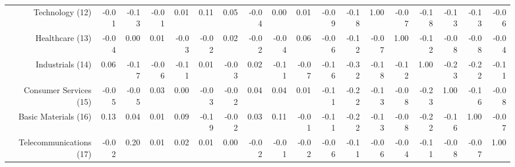 \begin{sidewaystable}
{\begin{tabular}{rrrrrrrrrrrrrrrrrr}
Technology (12)         & -0.01 & -0.13 & -0.01 & 0.01  & 0.11  & 0.05  & -0.04 & 0.00  & 0.01  & -0.09 & -0.18 & 1.00  & -0.07 & -0.18 & -0.13 & -0.13 & -0.06 \\
Healthcare (13)         & -0.04 & 0.00  & 0.01  & -0.03 & -0.02 & 0.02  & -0.02 & -0.04 & 0.06  & -0.06 & -0.12 & -0.07 & 1.00  & -0.12 & -0.08 & -0.08 & -0.04 \\
Industrials (14)        & 0.06  & -0.17 & -0.06 & -0.11 & 0.01  & -0.03 & 0.02  & -0.11 & -0.07 & -0.16 & -0.32 & -0.18 & -0.12 & 1.00  & -0.23 & -0.22 & -0.11 \\
Consumer Services (15)  & -0.05 & -0.05 & 0.03  & 0.00  & -0.03 & -0.02 & 0.04  & 0.04  & 0.01  & -0.11 & -0.22 & -0.13 & -0.08 & -0.23 & 1.00  & -0.16 & -0.08 \\
Basic Materials (16)    & 0.13  & 0.04  & 0.01  & 0.09  & -0.19 & -0.02 & 0.03  & 0.11  & -0.01 & -0.11 & -0.22 & -0.13 & -0.08 & -0.22 & -0.16 & 1.00  & -0.07 \\
Telecommunications (17) & -0.02 & 0.20  & 0.01  & 0.02  & 0.01  & 0.00  & -0.02 & -0.01 & -0.02 & -0.06 & -0.11 & -0.06 & -0.04 & -0.11 & -0.08 & -0.07 & 1.00 
           \\ 
   \bottomrule
\end{tabular}}
\end{sidewaystable}

